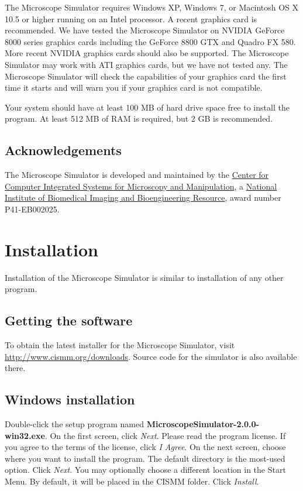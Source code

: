 \documentclass[11pt,titlepage,twoside]{article}
\begin{document}
The Microscope Simulator requires Windows XP, Windows 7, or Macintosh OS X 10.5 or higher running on an Intel processor. A recent graphics card is recommended. We have tested the Microscope Simulator on NVIDIA GeForce 8000 series graphics cards including the GeForce 8800 GTX and Quadro FX 580. More recent NVIDIA graphics cards should also be supported. The Microscope Simulator may work with ATI graphics cards, but we have not tested any. The Microscope Simulator will check the capabilities of your graphics card the first time it starts and will warn you if your graphics card is not compatible.

Your system should have at least 100 MB of hard drive space free to install the program. At least 512 MB of RAM is required, but 2 GB is recommended.

\subsection{Acknowledgements}

The Microscope Simulator is developed and maintained by the \href{http://www.cismm.org}{Center for Computer Integrated Systems for Microscopy and Manipulation}, a \href{http://www.nibib.nih.gov/}{National Institute of Biomedical Imaging and Bioengineering Resource}, award number P41-EB002025.

\section{Installation}

Installation of the Microscope Simulator is similar to installation of any other program.

\subsection{Getting the software}

To obtain the latest installer for the Microscope Simulator, visit \url{http://www.cismm.org/downloads}. Source code for the simulator is also available there.

\subsection{Windows installation}

Double-click the setup program named \textbf{MicroscopeSimulator-2.0.0-win32.exe}. On the first screen, click \emph{Next}. Please read the program license. If you agree to the terms of the license, click \emph{I Agree}. On the next screen, choose where you want to install the program. The default directory is the most-used option. Click \emph{Next}. You may optionally choose a different location in the Start Menu. By default, it will be placed in the CISMM folder. Click \emph{Install}.
\end{document}
